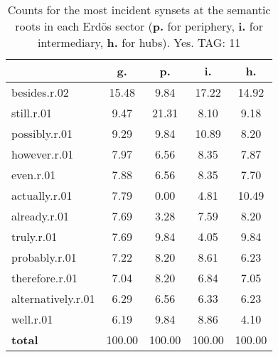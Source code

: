 \begin{table}[h!]
\begin{center}
\begin{tabular}{| l | c | c | c | c |}\hline
 & g. & p. & i. & h. \\\hline
besides.r.02 & 15.48  & 9.84  & 17.22  & 14.92 \\\hline
still.r.01 & 9.47  & 21.31  & 8.10  & 9.18 \\\hline
possibly.r.01 & 9.29  & 9.84  & 10.89  & 8.20 \\\hline
however.r.01 & 7.97  & 6.56  & 8.35  & 7.87 \\\hline
even.r.01 & 7.88  & 6.56  & 8.35  & 7.70 \\\hline
actually.r.01 & 7.79  & 0.00  & 4.81  & 10.49 \\\hline
already.r.01 & 7.69  & 3.28  & 7.59  & 8.20 \\\hline
truly.r.01 & 7.69  & 9.84  & 4.05  & 9.84 \\\hline
probably.r.01 & 7.22  & 8.20  & 8.61  & 6.23 \\\hline
therefore.r.01 & 7.04  & 8.20  & 6.84  & 7.05 \\\hline
alternatively.r.01 & 6.29  & 6.56  & 6.33  & 6.23 \\\hline
well.r.01 & 6.19  & 9.84  & 8.86  & 4.10 \\\hline
{{\bf total}} & 100.00  & 100.00  & 100.00  & 100.00 \\\hline
\end{tabular}
\caption{Counts for the most incident synsets at the semantic roots in each Erd\"os sector ({\bf p.} for periphery, {\bf i.} for intermediary, {\bf h.} for hubs). Yes. TAG: 11}
\end{center}
\end{table}